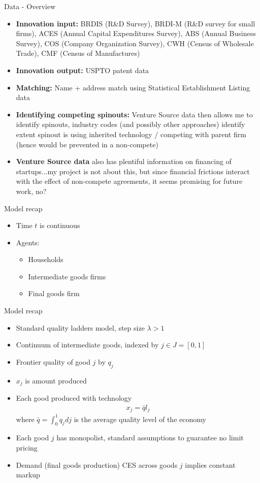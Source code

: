 \documentclass[english,usenames,dvipsnames]{beamer}
\begin{document}
\begin{frame}{Data - Overview}
\begin{itemize}
	\item \textbf{Innovation input:} BRDIS (R\&D Survey), BRDI-M (R\&D survey for small firms), ACES (Annual Capital Expenditures Survey), ABS (Annual Business Survey), COS (Company Organization Survey), CWH (Census of Wholesale Trade), CMF (Census of Manufactures)
	\item \textbf{Innovation output:} USPTO patent data
	\item \textbf{Matching:} Name + address match using Statistical Establishment Listing data 
	\item \textbf{Identifying competing spinouts:} Venture Source data then allows me to identify spinouts, industry codes (and possibly other approaches) identify extent spinout is using inherited technology / competing with parent firm (hence would be prevented in a non-compete)
	\item \textbf{Venture Source data} also has plentiful information on financing of startups...my project is not about this, but since financial frictions interact with the effect of non-compete agreements, it seems promising for future work, no?
\end{itemize}
\end{frame}

\begin{frame}{Model recap}
\begin{itemize}
	\item Time $t$ is continuous 
	\item Agents:
	\begin{itemize}
		\item Households 
		\item Intermediate goods firms
		\item Final goods firm 
	\end{itemize}
\end{itemize} 
\end{frame}

\begin{frame}{Model recap}
\begin{itemize}
	\item Standard quality ladders model, step size $\lambda > 1$
	\item Continuum of intermediate goods, indexed by $j\in J = [0,1]$
	\item Frontier quality of good $j$ by $q_j$
	\item $x_j$ is amount produced 
	\item Each good produced with technology
	\begin{align*}
	x_j = \bar{q} l_j
	\end{align*}
	where $\bar{q} = \int_0^1 q_j dj$ is the average quality level of the economy
	\item Each good $j$ has monopolist, standard assumptions to guarantee no limit pricing 
	\item Demand (final goods production) CES across goods $j$ implies constant markup
\end{itemize}
\end{frame}
\end{document}
